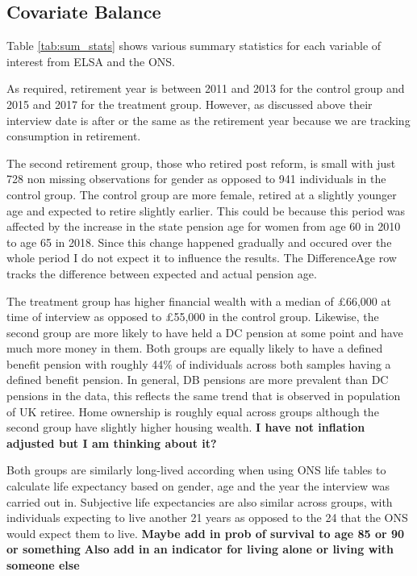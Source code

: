 \documentclass[12pt]{article}
\begin{document}
\subsection{Covariate Balance}

Table \ref{tab:sum_stats} shows various summary statistics for each variable of interest from ELSA and the ONS.

As required, retirement year is between 2011 and 2013 for the control group and 2015 and 2017 for the treatment group.
However, as discussed above their interview date is after or the same as the retirement year because we are tracking
consumption in retirement.

The second retirement group, those who retired post reform, is small with just 728 non missing observations for gender as opposed
to 941 individuals in the control group. The control group are more female, retired at a slightly younger age and expected to
retire slightly earlier. This could be because this period was affected by the increase in the state pension age for
women from age 60 in 2010 to age 65 in 2018. Since this change happened gradually and occured over the whole period
I do not expect it to influence the results. The DifferenceAge row tracks the difference between expected and actual
pension age.

The treatment group has higher financial wealth with a median of £66,000 at time of interview as opposed to £55,000
in the control group. Likewise, the second group are more likely to have held a DC pension at some point
and have much more money in them. Both groups are equally likely to have a defined benefit pension with roughly 44\% of
individuals across both samples having a defined benefit pension. In general, DB pensions are more prevalent than
DC pensions in the data, this reflects the same trend that is observed in population of UK retiree. Home ownership
is roughly equal across groups although the second group have slightly higher housing wealth.
\textbf{I have
    not inflation adjusted but I am thinking about it?}

Both groups are similarly long-lived according when using ONS life tables to calculate life expectancy
based on gender, age and the year the interview was carried out in. Subjective life expectancies are also similar
across groups, with individuals expecting to live another 21 years as opposed to the 24 that the ONS would expect
them to live.
\textbf{Maybe add in prob of survival to age 85 or 90 or something}
\textbf{Also add in an indicator for living alone or living with someone else}
\end{document}
